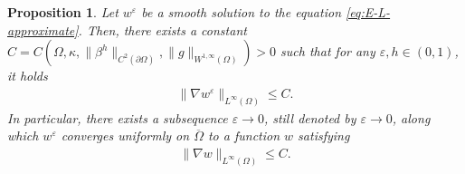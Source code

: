 \documentclass[11pt]{article}
\numberwithin{equation}{section}
\newtheorem{proposition}[theorem]{Proposition}
\newcommand{\fix}[1]{\textcolor{red}{#1}}
\def\le{\leqslant}
\begin{document}


\begin{proposition}\label{prop:a-priori-estimate}
Let $w^{\varepsilon}$ be a smooth solution to the equation \eqref{eq:E-L-approximate}. Then, there exists a constant $C=C(\Omega,\kappa,\|\beta^h\|_{C^2(\partial\Omega)},\|g\|_{W^{1,\infty}(\Omega)})>0$ such that for any $\varepsilon,h\in(0,1)$, it holds
\begin{align*}
\|\nabla w^\varepsilon\|_{L^\infty(\Omega)} \le C.
\end{align*}
In particular, there exists a subsequence $\varepsilon\to0$, still denoted by $\varepsilon\to0$, along which $w^{\varepsilon}$ converges uniformly on $\overline{\Omega}$ to a function $w$ satisfying
\begin{align*}
\|\nabla w\|_{L^\infty(\Omega)} \le C.
\end{align*}
\end{proposition}




\end{document}
